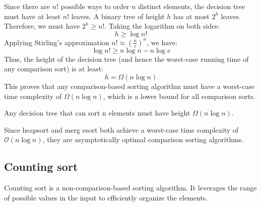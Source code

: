 Since there are $n!$ possible ways to order $n$ distinct elements, the decision tree must have at least $n!$ leaves. 
A binary tree of height $h$ has at most $2^h$ leaves.
Therefore, we must have $2^h\geq n!$.
Taking the logarithm on both sides:
\[h\geq \log n!\]
Applying Stirling's approximation $n!\approx\left(\frac{n}{e}\right)^n$, we have:
\[\log n!\geq n\log n-n\log e\]
Thus, the height of the decision tree (and hence the worst-case running time of any comparison sort) is at least:
\[h=\Omega(n\log n)\]
This proves that any comparison-based sorting algorithm must have a worst-case time complexity of $\Omega(n\log n)$, which is a lower bound for all comparison sorts.
\begin{theorem}
    Any decision tree that can sort n elements must have height $\Omega(n \log n)$.
\end{theorem}
\begin{corollary}
    Since heapsort and merg esort both achieve a worst-case time complexity of $\mathcal{O}(n\log n)$, they are asymptotically optimal comparison sorting algorithms.
\end{corollary}

\subsection{Counting sort}
Counting sort is a non-comparison-based sorting algorithm. 
It leverages the range of possible values in the input to efficiently organize the elements.

